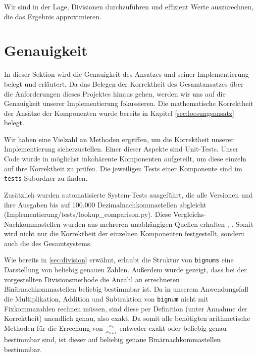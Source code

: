 \documentclass[course=erap]{aspdoc}
\begin{document}
Wir sind in der Lage, Divisionen durchzuführen und effizient Werte auszurechnen, die das Ergebnis approximieren.

\section{Genauigkeit} \label{sec:genauigkeit}
In dieser Sektion wird die Genauigkeit des Ansatzes und seiner Implementierung belegt und erläutert. Da das Belegen der Korrektheit des Gesamtansatzes über die Anforderungen dieses Projektes hinaus gehen, werden wir uns auf die Genauigkeit unserer Implementierung fokussieren. Die mathematische Korrektheit der Ansätze der Komponenten wurde bereits in Kapitel \ref{sec:loesungsansatz} belegt.

Wir haben eine Vielzahl an Methoden ergriffen, um die Korrektheit unserer Implementierung sicherzustellen. Einer dieser Aspekte sind Unit-Tests. Unser Code wurde in möglichst inkohärente Komponenten aufgeteilt, um diese einzeln auf ihre Korrektheit zu prüfen. Die jeweiligen Tests einer Komponente sind im \texttt{tests} Subordner zu finden.

Zusätzlich wurden automatisierte System-Tests ausgeführt, die alle Versionen und ihre Ausgaben bis auf 100.000 Dezimalnachkommastellen abgleicht (Implementierung/tests/lookup\_comparison.py). Diese Vergleichs-Nachkommastellen wurden aus mehreren unabhängigen Quellen erhalten \cite{sqrt2_Quelle}, \cite{sqrt2_Quelle2}. Somit wird nicht nur die Korrektheit der einzelnen Komponenten festgestellt, sondern auch die des Gesamtsystems.

Wie bereits in \ref{sec:division} erwähnt, erlaubt die Struktur von \texttt{bignums} eine Darstellung von beliebig genauen Zahlen. Außerdem wurde gezeigt, dass bei der vorgestellten Divisionsmethode die Anzahl an errechneten Binärnachkommastellen beliebig bestimmbar ist. Da in unserem Anwendungsfall die Multiplikation, Addition und Subtraktion von \texttt{bignum} nicht mit Fixkommazahlen rechnen müssen, sind diese per Definition (unter Annahme der Korrektheit) unendlich genau, also exakt. Da somit alle benötigten arithmetische Methoden für die Errechung von $\frac{x_n}{x_{n+1}}$ entweder exakt oder beliebig genau bestimmbar sind, ist dieser auf beliebig genaue Binärnachkommastellen bestimmbar.
\end{document}
